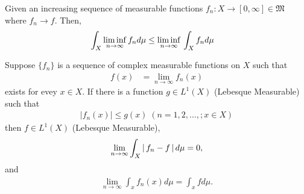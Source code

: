\documentclass[10pt,a4paper]{report}
\begin{document}
\begin{theorem} Given an increasing sequence of measurable functions $f_n : X \to [0,\infty] \in \mathfrak{M}$ where $f_n \to f$. Then,
\begin{align*}
	\int_X \underset{n\to\infty}\liminf \, f_n d\mu &\le \underset{n\to\infty}\liminf \, \int_X f_n d\mu 
\end{align*}

\end{theorem}

\begin{theorem}  Suppose $\{f_n\}$ is a sequence of complex measurable functions on $X$ such that 
\begin{align}
	f(x) &= \lim_{n\to\infty} f_n(x)
\end{align}exists for evey $x \in X$.  If there is a function $g\in L^1(X)$ (Lebesque Measurable) such that
\begin{align}
	|f_n(x)| \le g(x) \; (n=1,2,\dots,; x\in X)
\end{align}then $f \in L^1(X)$ (Lebesque Measurable),
\begin{align}
	\lim_{n\to \infty} \int_X \left |\, f_n-f \,\right |d\mu = 0,
\end{align}and
\begin{align}
	\lim_{n\to \infty} \int_x f_n(x)d\mu = \int_x fd\mu. 
\end{align}

\end{theorem}
\end{document}
